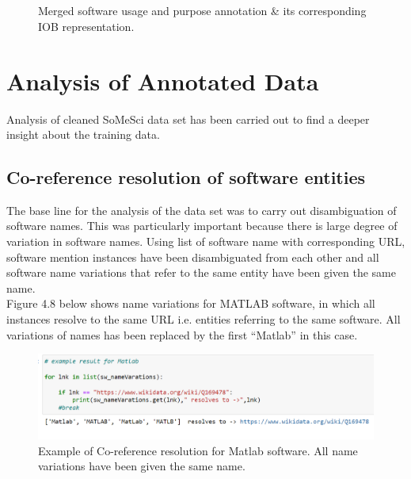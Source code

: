 \begin{figure}[h]
	
	\myfloatalign
	
	 \\
	\\
	\caption{Merged software usage and purpose annotation \& its corresponding IOB representation.}
\end{figure}




\section{Analysis of Annotated Data}
\label{sec:dataset:Analysis}

Analysis of cleaned SoMeSci data set has been carried out to find a deeper insight about the training data. 

\subsection{Co-reference resolution of software entities }
\label{subsec:dataset:Analysis:resolution}

The base line for the analysis of the data set was to carry out disambiguation of software names. This was particularly important because there is large degree of variation in software names. Using list of software name with corresponding URL, software mention instances have been disambiguated from each other and all software name variations that refer to the same entity have been given the same name. \\

Figure 4.8 below shows name variations for MATLAB software, in which all instances resolve to the same URL i.e. entities referring to the same software. All variations of names has been replaced by the first “Matlab” in this case.

\begin{figure}[htbp]
	\centering
	\includegraphics[width=1\textwidth]{4.graphics/figures/ch_4/pdf/Corefresolution}
	\caption{Example of Co-reference resolution for Matlab software. All name variations have been given the same name.}
	\label{fig:chapter04:setup}
\end{figure}


